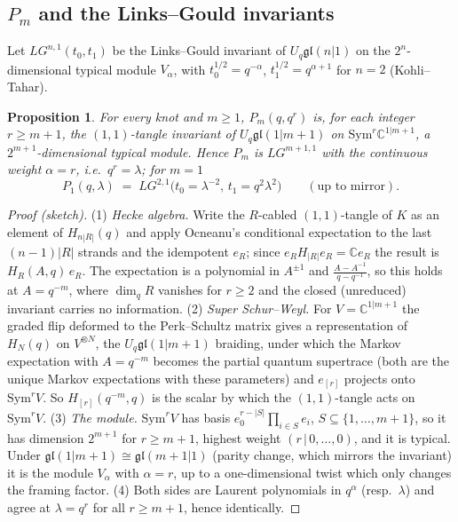 \documentclass[11pt]{article}
\newtheorem{proposition}{Proposition}
\theoremstyle{definition}
\theoremstyle{remark}
\begin{document}
\subsection{$P_m$ and the Links--Gould invariants}
Let $LG^{n,1}(t_0,t_1)$ be the Links--Gould invariant of $U_q\mathfrak{gl}(n|1)$ on the $2^n$-dimensional
typical module $V_\alpha$, with $t_0^{1/2}=q^{-\alpha}$, $t_1^{1/2}=q^{\alpha+1}$ for $n=2$ (Kohli--Tahar).
\begin{proposition}\label{prop:lg}
For every knot and $m\ge1$, $P_m(q,q^r)$ is, for each integer $r\ge m+1$, the $(1,1)$-tangle invariant of
$U_q\mathfrak{gl}(1|m+1)$ on $\mathrm{Sym}^r\mathbb{C}^{1|m+1}$, a $2^{m+1}$-dimensional typical module.  Hence
$P_m$ is $LG^{m+1,1}$ with the continuous weight $\alpha=r$, i.e.\ $q^r=\lambda$; for $m=1$
\begin{equation}\label{LG}
  P_1(q,\lambda)\;=\;LG^{2,1}\big(t_0=\lambda^{-2},\,t_1=q^2\lambda^{2}\big)\qquad(\text{up to mirror}).
\end{equation}
\end{proposition}
\begin{proof}[Proof (sketch)]
(1) \emph{Hecke algebra.}  Write the $R$-cabled $(1,1)$-tangle of $K$ as an element of $H_{n|R|}(q)$ and apply
Ocneanu's conditional expectation to the last $(n-1)|R|$ strands and the idempotent $e_R$; since $e_RH_{|R|}e_R=
\mathbb{C}e_R$ the result is $H_R(A,q)\,e_R$.  The expectation is a polynomial in $A^{\pm1}$ and
$\frac{A-A^{-1}}{q-q^{-1}}$, so this holds at $A=q^{-m}$, where $\dim_qR$ vanishes for $r\ge2$ and the closed
(unreduced) invariant carries no information.
(2) \emph{Super Schur--Weyl.}  For $V=\mathbb{C}^{1|m+1}$ the graded flip deformed to the Perk--Schultz matrix gives
a representation of $H_N(q)$ on $V^{\otimes N}$, the $U_q\mathfrak{gl}(1|m+1)$ braiding, under which the Markov
expectation with $A=q^{-m}$ becomes the partial quantum supertrace (both are the unique Markov expectations
with these parameters) and $e_{[r]}$ projects onto $\mathrm{Sym}^r V$.  So $H_{[r]}(q^{-m},q)$ is the scalar by
which the $(1,1)$-tangle acts on $\mathrm{Sym}^rV$.
(3) \emph{The module.}  $\mathrm{Sym}^rV$ has basis $e_0^{r-|S|}\prod_{i\in S}e_i$, $S\subseteq\{1,\dots,m+1\}$,
so it has dimension $2^{m+1}$ for $r\ge m+1$, highest weight $(r\,|\,0,\dots,0)$, and it is typical.  Under
$\mathfrak{gl}(1|m+1)\cong\mathfrak{gl}(m+1|1)$ (parity change, which mirrors the invariant) it is the module
$V_\alpha$ with $\alpha=r$, up to a one-dimensional twist which only changes the framing factor.
(4) Both sides are Laurent polynomials in $q^\alpha$ (resp.\ $\lambda$) and agree at $\lambda=q^r$ for all
$r\ge m+1$, hence identically.
\end{proof}
\end{document}
